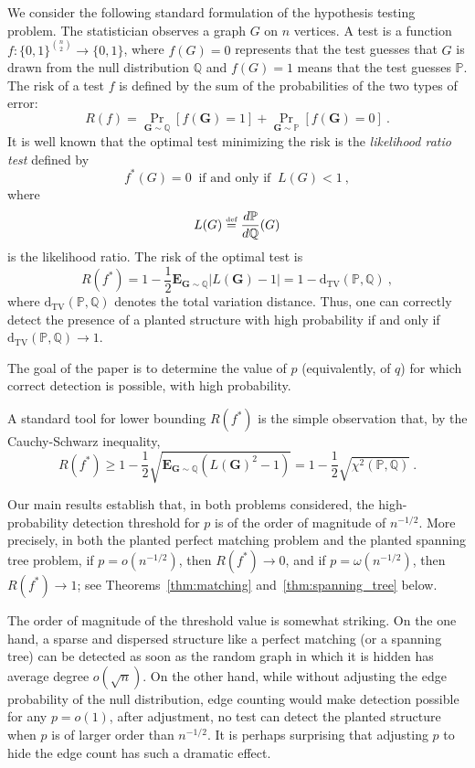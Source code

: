 \documentclass[11pt]{article}
\newcommand{\e}{{\mathbf E}}
\newcommand{\dtv}{\mathrm{d}_{\mathrm{TV}}}
\newcommand{\bG}{\mathbf{G}}
\newcommand{\bbP}{\mathbb{P}}
\newcommand{\bbQ}{\mathbb{Q}}
\newcommand\defeq{\stackrel{\text{\tiny def}}{=}}
\numberwithin{equation}{section}
\numberwithin{thm}{section}
\begin{document}
We consider the following standard formulation of the hypothesis testing problem. The statistician observes a graph $G$ on $n$ vertices. A test is a function $f:\{0,1\}^{\binom{n}{2}}\to \{0,1\}$, where $f(G)=0$ represents that the test guesses that $G$ is drawn from the null distribution $\bbQ$ and $f(G)=1$ means that the test guesses $\bbP$. The risk of a test $f$ is defined by the sum of the probabilities of the two types of error:
\[
   R(f) = \Pr_{\bG \sim \bbQ}[f(\bG)=1] + \Pr_{\bG \sim \bbP}[f(\bG)=0]~.
\]
It is well known that the optimal test minimizing the risk is the \emph{likelihood ratio test} defined by
\[
f^*(G) = 0 \ \text{ if and only if } \  L(G) < 1~,
\]
where
\[
L(G) 
\defeq \frac{d\bbP}{d\bbQ}(G)
\]
is the likelihood ratio. The risk of the optimal test is
\[
R(f^*) 
= 1- \frac{1}{2}
\e_{\bG \sim \bbQ} |L(\bG)-1|= 1-\dtv(\bbP,\bbQ)~,
\]
where $\dtv(\bbP,\bbQ)$ denotes the total variation distance. Thus, one can correctly detect the presence of a planted structure with high probability if and only if $\dtv(\bbP,\bbQ) \to 1$. 

The goal of the paper is to determine the value of $p$ (equivalently, of $q$) for which correct detection is possible, with high probability.

A standard tool for lower bounding $R(f^*)$ is the simple observation that, by the Cauchy-Schwarz inequality,
\[
R(f^*) \ge 1- \frac{1}{2}
\sqrt{\e_{\bG \sim \bbQ} (L(\bG)^2-1)}
= 1 -\frac{1}{2} \sqrt{\chi^2(\bbP,\bbQ)}~.
\]

Our main results establish that, in both problems considered, the high-probability detection threshold for $p$ is of the order of magnitude of $n^{-1/2}$.
More precisely, in both the planted perfect matching problem and the planted spanning tree problem, if $p= o(n^{-1/2})$, then $R(f^*) \to 0$, and if $p= \omega(n^{-1/2})$, then $R(f^*) \to 1$; 
see Theorems~\ref{thm:matching} and~\ref{thm:spanning_tree} below.

The order of magnitude of the threshold value is somewhat striking. 
On the one hand, a sparse and dispersed structure like a perfect matching (or a spanning tree) can be detected as soon as the random graph in which it is hidden has average degree $o(\sqrt{n})$. On the other hand, while without adjusting the edge probability of the null distribution, edge counting would make detection possible for any $p=o(1)$, after adjustment, no test can detect the planted structure when $p$ is of larger order than $n^{-1/2}$.
It is perhaps surprising that adjusting $p$ to hide the edge count has such a dramatic effect.
\end{document}
